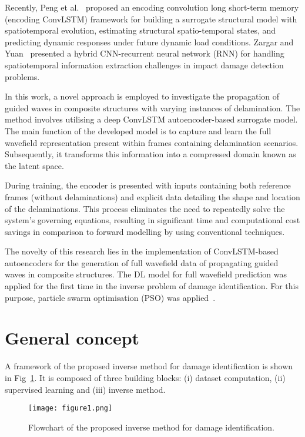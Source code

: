 Recently, Peng et al.~\cite{peng2021structural} proposed an encoding convolution long short-term memory (encoding ConvLSTM) framework for building a surrogate structural model with spatiotemporal evolution, estimating structural spatio-temporal states, and predicting dynamic responses under future dynamic load conditions. 
Zargar and Yuan~\cite{zargar2021impact} presented a hybrid CNN-recurrent neural network (RNN) for handling spatiotemporal information extraction challenges in impact damage detection problems.

In this work, a novel approach is employed to investigate the propagation of guided waves in composite structures with varying instances of delamination. 
The method involves utilising a deep ConvLSTM autoencoder-based surrogate model. 
The main function of the developed model is to capture and learn the full wavefield representation present within frames containing delamination scenarios. 
Subsequently, it transforms this information into a compressed domain known as the latent space.

During training, the encoder is presented with inputs containing both reference frames (without delaminations) and explicit data detailing the shape and location of the delaminations. 
This process eliminates the need to repeatedly solve the system's governing equations, resulting in significant time and computational cost savings in comparison to forward modelling by using conventional techniques.

The novelty of this research lies in the implementation of ConvLSTM-based autoencoders for the generation of full wavefield data of propagating guided waves in composite structures.
The DL model for full wavefield prediction was applied for the first time in the inverse problem of damage identification.
For this purpose, particle swarm optimisation (PSO) was applied~\cite{Keneddy1995}.
\section{General concept}
A framework of the proposed inverse method for damage identification is shown in Fig~\ref{fig:complete_flowchart}.
It is composed of three building blocks: (i) dataset computation, (ii) supervised learning and (iii) inverse method.

\begin{figure} [h!]
	\begin{center}
		\texttt{[image: figure1.png]}
	\end{center}
	\caption{Flowchart of the proposed inverse method for damage identification.} 
	\label{fig:complete_flowchart}
\end{figure}

